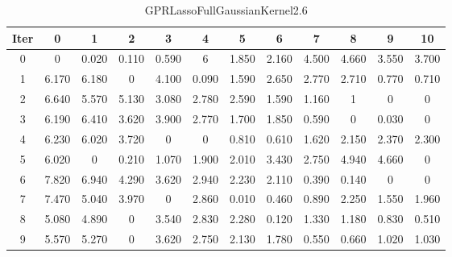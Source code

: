 \begin{table}
	\begin{center}
		\begin{tabular}{|c|c|c|c|c|c|c|c|c|c|c|c|}
			\hline
			Iter & 0 & 1 & 2 & 3 & 4 & 5 & 6 & 7 & 8 & 9 & 10 \\
			\hline
			0 & 0 & 0.020 & 0.110 & 0.590 & 6 & 1.850 & 2.160 & 4.500 & 4.660 & 3.550 & 3.700 \\
			\hline
			1 & 6.170 & 6.180 & 0 & 4.100 & 0.090 & 1.590 & 2.650 & 2.770 & 2.710 & 0.770 & 0.710 \\
			\hline
			2 & 6.640 & 5.570 & 5.130 & 3.080 & 2.780 & 2.590 & 1.590 & 1.160 & 1 & 0 & 0 \\
			\hline
			3 & 6.190 & 6.410 & 3.620 & 3.900 & 2.770 & 1.700 & 1.850 & 0.590 & 0 & 0.030 & 0 \\
			\hline
			4 & 6.230 & 6.020 & 3.720 & 0 & 0 & 0.810 & 0.610 & 1.620 & 2.150 & 2.370 & 2.300 \\
			\hline
			5 & 6.020 & 0 & 0.210 & 1.070 & 1.900 & 2.010 & 3.430 & 2.750 & 4.940 & 4.660 & 0 \\
			\hline
			6 & 7.820 & 6.940 & 4.290 & 3.620 & 2.940 & 2.230 & 2.110 & 0.390 & 0.140 & 0 & 0 \\
			\hline
			7 & 7.470 & 5.040 & 3.970 & 0 & 2.860 & 0.010 & 0.460 & 0.890 & 2.250 & 1.550 & 1.960 \\
			\hline
			8 & 5.080 & 4.890 & 0 & 3.540 & 2.830 & 2.280 & 0.120 & 1.330 & 1.180 & 0.830 & 0.510 \\
			\hline
			9 & 5.570 & 5.270 & 0 & 3.620 & 2.750 & 2.130 & 1.780 & 0.550 & 0.660 & 1.020 & 1.030 \\
			\hline
		\end{tabular}
	\end{center}
	\caption{GPRLassoFullGaussianKernel2.6}
\end{table}